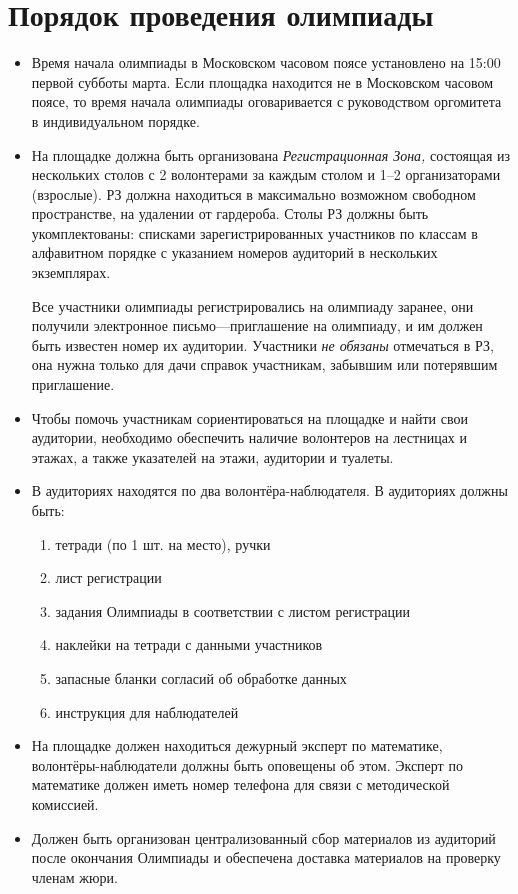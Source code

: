 \documentclass[a4paper,12pt]{article}
\begin{document}
\section{Порядок проведения олимпиады}

\begin{itemize}
	\item Время начала олимпиады в Московском часовом поясе установлено на 15:00 первой субботы марта. Если площадка находится не в Московском часовом поясе, то время начала олимпиады оговаривается с руководством оргомитета в индивидуальном порядке.
	\item На площадке должна быть организована {\itshape Регистрационная Зона,} состоящая из нескольких столов с 2 волонтерами за каждым столом и 1–2 организаторами (взрослые). РЗ должна находиться в максимально возможном свободном пространстве, на удалении от гардероба. Столы РЗ должны быть укомплектованы: списками зарегистрированных участников по классам в алфавитном порядке с указанием номеров аудиторий в нескольких экземплярах.

	Все участники олимпиады регистрировались на олимпиаду заранее, они получили электронное письмо—приглашение на олимпиаду, и им должен быть известен номер их аудитории. Участники {\it не обязаны} отмечаться в РЗ, она нужна только для дачи справок участникам, забывшим или потерявшим приглашение.
	\item Чтобы помочь участникам сориентироваться на площадке и найти свои аудитории, необходимо обеспечить наличие волонтеров на лестницах и этажах, а также указателей на этажи, аудитории и туалеты.
	\item В аудиториях находятся по два волонтёра-наблюдателя. В аудиториях должны быть: \begin{enumerate}
		\item тетради (по 1 шт. на место), ручки
		\item лист регистрации
		\item задания Олимпиады в соответствии с листом регистрации
		\item наклейки на тетради с данными участников
		\item запасные бланки согласий об обработке данных
		\item инструкция для наблюдателей
	\end{enumerate}
	\item На площадке должен находиться дежурный эксперт по математике, волонтёры-наблюдатели должны быть оповещены об этом. Эксперт по математике должен иметь номер телефона для связи с методической комиссией.
	\item Должен быть организован централизованный сбор материалов из аудиторий после окончания Олимпиады и обеспечена доставка материалов на проверку членам жюри.
\end{itemize}
\end{document}
